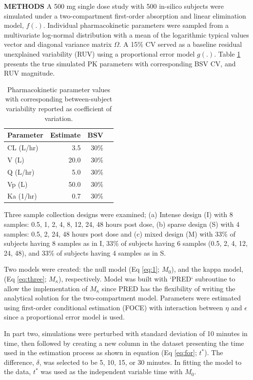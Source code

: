 \documentclass[final]{beamer}
\newlength{\colwidth}
\begin{document}
\begin{frame}[t]
\begin{columns}[t]
\begin{column}{\colwidth}
\begin{block}{\textbf{METHODS}}
A 500 mg single dose study with 500 in-silico subjects were simulated under a two-compartment first-order absorption and linear elimination model, $f(.)$. Individual pharmacokinetic parameters were sampled from a multivariate log-normal distribution with a mean of the logarithmic typical values vector and diagonal variance matrix $\Omega$. A 15\% CV served as a baseline residual unexplained variability (RUV) using a proportional error model $g(.)$. Table \ref{tab:1} presents the true simulated PK parameters with corresponding BSV CV, and RUV magnitude.   
\begin{table}
		\label{tab:1}
      \centering
      \begin{tabular}{l r r c}
        \toprule
        \textbf{Parameter} & \textbf{Estimate} & \textbf{BSV} \\
        \midrule
        CL (L/hr) & 3.5 & 30\% \\
        V (L)& 20.0 & 30\% \\
        Q (L/hr)& 5.0 & 30\%  \\
        Vp (L)& 50.0 & 30\% \\
        Ka (1/hr)& 0.7 & 30\% \\
        \bottomrule
      \end{tabular}
      \caption{Pharmacokinetic parameter values with corresponding between-subject variability reported as coefficient of variation. }
    \end{table}
Three sample collection designs were examined; (a) Intense design (I) with 8 samples: 0.5, 1, 2, 4, 8, 12, 24, 48 hours post dose, (b) sparse design (S) with 4 samples: 0.5, 2, 24, 48 hours post dose and (c) mixed design (M) with 33\% of subjects having 8 samples as in I, 33\%  of subjects having 6 samples (0.5, 2, 4, 12, 24, 48), and 33\% of subjects having 4 samples as in S.\par
Two models were created: the null model (Eq \ref{eq:1}; $M_0$), and the kappa model, (Eq \ref{eq:three};  $M_\kappa$), respectively. Model was built with `PRED` subroutine to allow the implementation of $M_\kappa$ since PRED has the flexibility of writing the analytical solution for the two-compartment model. Parameters were estimated using first-order conditional estimation (FOCE) with interaction between $\eta$ and $\epsilon$ since a proportional error model is used.\par
In part two, simulations were perturbed with standard deviation of 10 minutes   in time, then followed by creating a new column in the dataset presenting the time used in the estimation process as shown in equation (Eq \ref{eq:for}; $t^*$). The difference, $\delta$, was selected to be 5, 10, 15, or 30 minutes. In fitting the model to the data, $t^*$ was used as the independent variable time with $M_0$.\par

\end{block}
\end{column}
\end{columns}
\end{frame}
\end{document}
